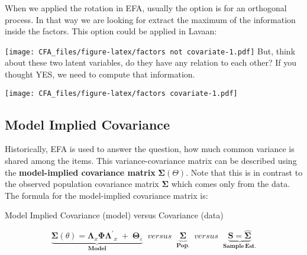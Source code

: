 \documentclass[
]{article}
\newenvironment{Shaded}{\begin{snugshade}}{\end{snugshade}}
\newcommand{\NormalTok}[1]{#1}
\newcommand{\OtherTok}[1]{\textcolor[rgb]{0.56,0.35,0.01}{#1}}
\newcommand{\SpecialCharTok}[1]{\textcolor[rgb]{0.00,0.00,0.00}{#1}}
\newcommand{\StringTok}[1]{\textcolor[rgb]{0.31,0.60,0.02}{#1}}
\begin{document}
When we applied the rotation in EFA, usually the option is for an
orthogonal process. In that way we are looking for extract the maximum
of the information inside the factors. This option could be applied in
Lavaan:

\begin{Shaded}
\end{Shaded}

\texttt{[image: CFA\_files/figure-latex/factors not covariate-1.pdf]}
But, think about these two latent variables, do they have any relation
to each other? If you thought YES, we need to compute that information.

\texttt{[image: CFA\_files/figure-latex/factors covariate-1.pdf]}

\hypertarget{model-implied-covariance}{%
\subsection{Model Implied Covariance}\label{model-implied-covariance}}

Historically, EFA is used to answer the question, how much common
variance is shared among the items. This variance-covariance matrix can
be described using the \textbf{model-implied covariance matrix}
\(\mathbf{\Sigma}(\Theta)\). Note that this is in contrast to the
observed population covariance matrix \(\mathbf{\Sigma}\) which comes
only from the data. The formula for the model-implied covariance matrix
is:

Model Implied Covariance (model) versus Covariance (data)

\[
\underbrace{\mathbf{\Sigma}(\theta)=\mathbf{\Lambda}_{x} \mathbf{\Phi} \mathbf{\Lambda^{\prime}}_{x} \; + \; \mathbf{\Theta}_{\varepsilon}}_{\mathbf{Model}}
\; \; versus \; \; \underbrace{\mathbf{\Sigma}}_{\mathbf{Pop.}} \; \; versus \; \; \underbrace{\mathbf{S}=\hat{\mathbf{\Sigma}}}_{\mathbf{Sample \, Est.}}
\]
\end{document}

